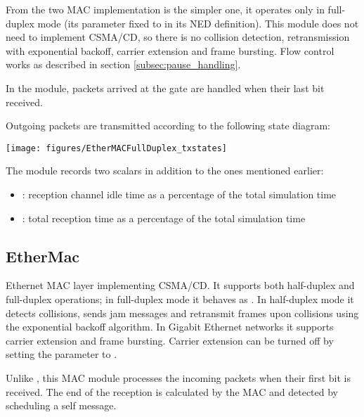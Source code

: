 From the two MAC implementation  is the simpler one,
it operates only in full-duplex mode (its  parameter fixed to
 in its NED definition). This module does not need to implement
CSMA/CD, so there is no collision detection, retransmission with exponential backoff,
carrier extension and frame bursting. Flow control works as described in section
\ref{subsec:pause_handling}.


In the  module,
packets arrived at the  gate are handled when their last bit received.

Outgoing packets are transmitted according to the following state diagram:

\begin{center}
\texttt{[image: figures/EtherMACFullDuplex\_txstates]}
\end{center}

The  module records two scalars in addition to the
ones mentioned earlier:
\begin{itemize}
\item {}: reception channel idle time
        as a percentage of the total simulation time
\item {}: total reception
        time as a percentage of the total simulation time
\end{itemize}

\subsection{EtherMac}

Ethernet MAC layer implementing CSMA/CD. It supports both half-duplex and full-duplex operations;
in full-duplex mode it behaves as . In half-duplex  mode
it detects collisions, sends jam messages and retransmit frames upon collisions using
the exponential backoff algorithm. In Gigabit Ethernet networks it supports carrier
extension and frame bursting. Carrier extension can be turned off by setting the
 parameter to .

Unlike , this MAC module processes the incoming packets when their
first bit is received. The end of the reception is calculated by the MAC and
detected by scheduling a self message.

